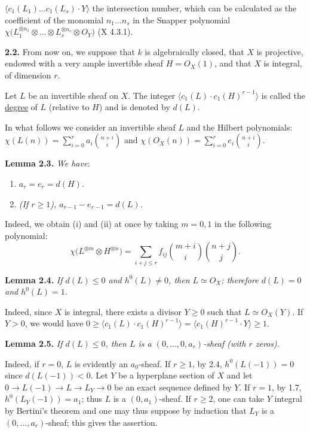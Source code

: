 %
\(\langle c_1(L_1)\ldots c_1(L_s)\cdot Y\rangle\) the intersection number, which can be calculated as the coefficient of the monomial \(n_1\ldots n_s\) in the Snapper polynomial \(\chi\bigl(L_1^{\otimes n_1}\otimes\ldots\otimes L_s^{\otimes n_s}\otimes{O}_Y\bigr)\) (X 4.3.1).

\textbf{2.2.} From now on, we suppose that \(k\) is algebraically closed, that \(X\) is projective, endowed with a very ample invertible sheaf \(H={O}_X(1)\), and that \(X\) is integral, of dimension \(r\).

Let \(L\) be an invertible sheaf on \(X\). The integer \(\langle c_1(L)\cdot c_1(H)^{r-1}\rangle\) is called the \uline{degree} of \(L\) (relative to \(H\)) and is denoted by \(d(L)\).

In what follows we consider an invertible sheaf \(L\) and the Hilbert polynomials: \(\chi(L(n))=\sum_{i=0}^{r}a_i\binom{n+i}{i}\) and \(\chi({O}_X(n))=\sum_{i=0}^{r}e_i\binom{n+i}{i}\).

\textbf{Lemma 2.3.} \emph{We have}:
\begin{enumerate}[label=(\roman*)]
\item \emph{\(a_r=e_r=d(H)\).}
\item \emph{(If \(r\ge1\)), \(a_{r-1}-e_{r-1}=d(L)\).}
\end{enumerate}

Indeed, we obtain (i) and (ii) at once by taking \(m=0,1\) in the following polynomial:
\[
\chi\bigl(L^{\otimes m}\otimes H^{\otimes n}\bigr)
=
\sum_{i+j\le r} f_{ij}\binom{m+i}{i}\binom{n+j}{j}.
\]

\textbf{Lemma 2.4.} \emph{If \(d(L)\le0\) and \(h^0(L)\ne0\), then \(L\simeq{O}_X\); therefore \(d(L)=0\) and \(h^0(L)=1\).}

Indeed, since \(X\) is integral, there exists a divisor \(Y\ge0\) such that \(L\simeq{O}_X(Y)\). If \(Y>0\), we would have \(0\ge\langle c_1(L)\cdot c_1(H)^{r-1}\rangle=\langle c_1(H)^{r-1}\cdot Y\rangle\ge1\).

\textbf{Lemma 2.5.} \emph{If \(d(L)\le0\), then \(L\) is a \((0,\ldots,0,a_r)\)-sheaf (with \(r\) zeros).}

%
Indeed, if \(r=0\), \(L\) is evidently an \(a_0\)-sheaf. If \(r\ge1\), by 2.4, \(h^0(L(-1))=0\) since \(d(L(-1))<0\). Let \(Y\) be a hyperplane section of \(X\) and let \(0\longrightarrow L(-1)\longrightarrow L\longrightarrow L_Y\longrightarrow0\) be an exact sequence defined by \(Y\). If \(r=1\), by 1.7, \(h^0(L_Y(-1))=a_1\); thus \(L\) is a \((0,a_1)\)-sheaf. If \(r\ge2\), one can take \(Y\) integral by Bertini's theorem and one may thus suppose by induction that \(L_Y\) is a \((0,\ldots,a_r)\)-sheaf; this gives the assertion.

